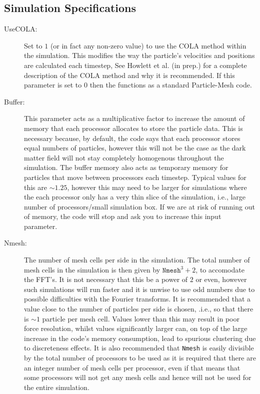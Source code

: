 \documentclass[12pt,twoside,a4paper]{article}
\begin{document}
\subsection{Simulation Specifications}
\begin{description}
\item[UseCOLA:]{Set to $1$ (or in fact any non-zero value) to use the COLA method within the simulation. This modifies the way the particle's velocities and positions are calculated each timestep, See Howlett et al. (in prep.) for a complete description of the COLA method and why it is recommended. If this parameter is set to 0 then the {\PICOLA} functions as a standard Particle-Mesh code.}
\item[Buffer:]{This parameter acts as a multiplicative factor to increase the amount of memory that each processor allocates to store the particle data. This is necessary because, by default, the code says that each processor stores equal numbers of particles, however this will not be the case as the dark matter field will not stay completely homogenous throughout the simulation. The buffer memory also acts as temporary memory for particles that move between processors each timestep. Typical values for this are $\sim 1.25$, however this may need to be larger for simulations where the each processor only has a very thin slice of the simulation, i.e., large number of processors/small simulation box. If we are at risk of running out of memory, the code will stop and ask you to increase this input parameter.}
\item[Nmesh:]{The number of mesh cells per side in the simulation. The total number of mesh cells in the simulation is then given by $\texttt{Nmesh}^{3}+2$, to accomodate the FFT's. It is not necessary that this be a power of $2$ or even, however such simulations will run faster and it is unwise to use odd numbers due to possible difficulties with the Fourier transforms. It is recommended that a value close to the number of particles per side is chosen, .i.e., so that there is $\sim 1$ particle per mesh cell. Values lower than this may result in poor force resolution, whilst values significantly larger can, on top of the large increase in the code's memory consumption, lead to spurious clustering due to discreteness effects. It is also recommended that \texttt{Nmesh} is easily divisible by the total number of processors to be used as it is required that there are an integer number of mesh cells per processor, even if that means that some processors will not get any mesh cells and hence will not be used for the entire simulation.}

\end{description}
\end{document}
